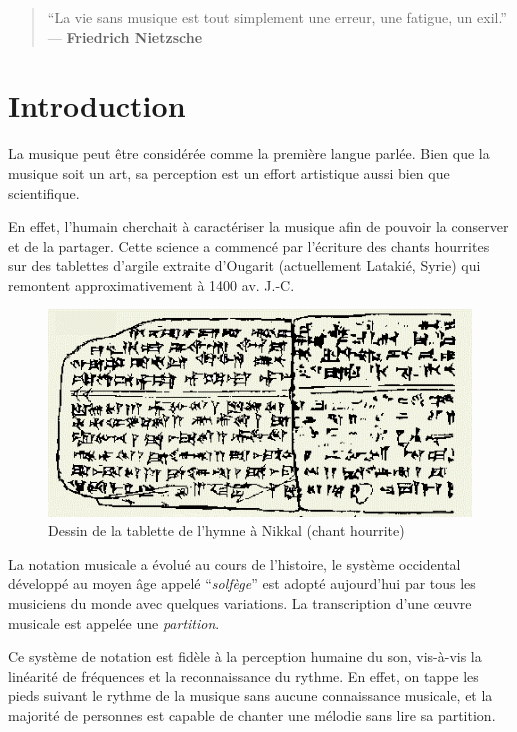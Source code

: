 \documentclass[]{article}
\begin{document}
{
\setcounter{tocdepth}{2}
\tableofcontents
}
\pagebreak

\begin{quote}
``La vie sans musique est tout simplement une erreur, une fatigue, un
exil.'' --- \textbf{Friedrich Nietzsche}
\end{quote}

\hypertarget{introduction}{%
\section{Introduction}\label{introduction}}

La musique peut être considérée comme la première langue parlée. Bien
que la musique soit un art, sa perception est un effort artistique aussi
bien que scientifique.

En effet, l'humain cherchait à caractériser la musique afin de pouvoir
la conserver et de la partager. Cette science a commencé par l'écriture
des chants hourrites sur des tablettes d'argile extraite d'Ougarit
(actuellement Latakié, Syrie) qui remontent approximativement à 1400 av.
J.-C. \citep{ougarit}

\begin{figure}
\centering
\includegraphics{img/Hurritische_hymne.png}
\caption{Dessin de la tablette de l'hymne à Nikkal (chant hourrite)}
\end{figure}

La notation musicale a évolué au cours de l'histoire, le système
occidental développé au moyen âge appelé ``\emph{solfège}'' est adopté
aujourd'hui par tous les musiciens du monde avec quelques variations. La
transcription d'une œuvre musicale est appelée une \emph{partition}.

Ce système de notation est fidèle à la perception humaine du son,
vis-à-vis la linéarité de fréquences et la reconnaissance du rythme. En
effet, on tappe les pieds suivant le rythme de la musique sans aucune
connaissance musicale, et la majorité de personnes est capable de
chanter une mélodie sans lire sa partition.
\end{document}
